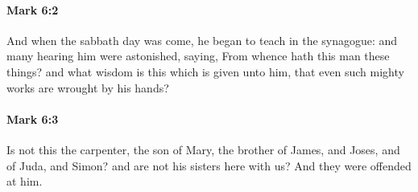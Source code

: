 		\paragraph{Mark 6:2} %
			\label{MARK-6-2}

			And when the sabbath day was come, he began to teach in the synagogue: and many hearing him were astonished, saying, From whence hath this man these things? and what wisdom is this which is given unto him, that even such mighty works are wrought by his hands?

			\begin{framed}
			\scriptsize
				\begin{compactdesc}
					\item[SBLG] 
				\end{compactdesc}
			\end{framed}

		\paragraph{Mark 6:3} %
			\label{MARK-6-3}

			Is not this the carpenter, the son of Mary, the brother of James, and Joses, and of Juda, and Simon? and are not his sisters here with us? And they were offended at him.

